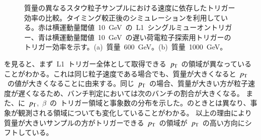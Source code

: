 \begin{figure}[H]
\begin{minipage}{0.49\hsize}
    \subcaption{}
    \end{minipage}
    \caption[質量の異なるスタウ粒子サンプルにおける速度に依存したトリガー効率の比較]{質量の異なるスタウ粒子サンプルにおける速度に依存したトリガー効率の比較。タイミング較正後のシミュレーションを利用している。赤は横運動量閾値~10~GeV~の~L1~シングルミューオントリガー、青は横運動量閾値~10~GeV~の遅い荷電粒子探索用トリガーのトリガー効率を示す。(a)~質量~600~GeV。(b)~質量~1000~GeV。}\label{fig:tribeta6}
\end{figure}
を見ると、まず~L1~トリガー全体として取得できる~$p_{\rm{T}}$~の領域が異なっていることがわかる。これは同じ粒子速度である場合でも、質量が大きくなると~$p_{\rm{T}}$~の値が大きくなることに由来する。同じ~$p_{\rm{T}}$~の場合、質量が大きい方が粒子速度が遅くなるため、バンチ判定においては次のバンチの割合が大きくなる。
また、に~$p_{\rm{T}}$,~$\beta$~の~トリガー領域と事象数の分布を示した。のときとは異なり、事象が観測される領域についても変化していることがわかる。
以上の理由により質量が大きいサンプルの方がトリガーできる~$p_{\rm{T}}$~の領域が~$p_{\rm{T}}$~の高い方向にシフトしている。

